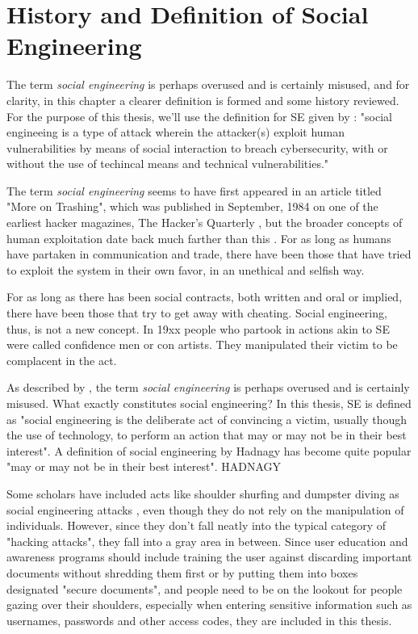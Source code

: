 \chapter{History and Definition of Social Engineering\label{definition}}

The term \textit{social engineering} is perhaps overused and is certainly misused, and for clarity, in this chapter a clearer definition is formed and some history reviewed. For the purpose of this thesis, we'll use the definition for SE given by \cite{wang_defining_2020}: "social engineeing is a type of attack wherein the attacker(s) exploit human vulnerabilities by means of social interaction to breach cybersecurity, with or without the use of techincal means and technical vulnerabilities."

The term \textit{social engineering} seems to have first appeared in an article titled "More on Trashing", which was published in September, 1984 on one of the earliest hacker magazines, The Hacker's Quarterly \citep{wang_defining_2020}, but the broader concepts of human exploitation date back much farther than this \citep{qin_investigation_2007}. For as long as humans have partaken in communication and trade, there have been those that have tried to exploit the system in their own favor, in an unethical and selfish way.


For as long as there has been social contracts, both written and oral or implied, there have been those that try to get away with cheating. Social engineering, thus, is not a new concept. In 19xx people who partook in actions akin to SE were called confidence men or con artists. They manipulated their victim to be complacent in the act.

As described by \cite{abiteboul}, the term \textit{social engineering} is perhaps overused and is certainly misused. What exactly constitutes social engineering? In this thesis, SE is defined as "social engineering is the deliberate act of convincing a victim, usually though the use of technology, to perform an action that may or may not be in their best interest". A definition of social engineering by Hadnagy has become quite popular "may or may not be in their best interest". HADNAGY

Some scholars have included acts like shoulder shurfing and dumpster diving as social engineering attacks \citep{abiteboul}, even though they do not rely on the manipulation of individuals.  However, since they don't fall neatly into the typical category of "hacking attacks", they fall into a gray area in between. Since user education and awareness programs should include training the user against discarding important documents without shredding them first or by putting them into boxes designated "secure documents", and people need to be on the lookout for people gazing over their shoulders, especially when entering sensitive information such as usernames, passwords and other access codes, they are included in this thesis.